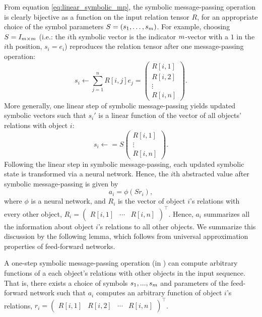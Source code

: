 From equation \eqref{eq:linear_symbolic_mp}, the symbolic message-passing operation is clearly bijective as a function on the input relation tensor $R$, for an appropriate choice of the symbol parameters $S = (s_1,\ldots, s_m)$. For example, choosing $S = I_{m \times m}$ (i.e.: the $i$th symbolic vector is the indicator $m$-vector with a $1$ in the $i$th position, $s_i = e_i$) reproduces the relation tensor after one message-passing operation:
\begin{equation*}
	s_i  \leftarrow  \sum_{j=1}^{n} R[i,j] e_j = \begin{pmatrix}R[i,1] \\ R[i,2] \\ \vdots \\ R[i,n]\end{pmatrix}.
\end{equation*}
More generally, one linear step of symbolic message-passing yields updated symbolic vectors such that $s_i'$ is a linear function of the vector of all objects' relations with object $i$:
\begin{equation*}
	s_i \leftarrow = S \begin{pmatrix}R[i,1] \\ \vdots \\ R[i,n]\end{pmatrix}.
\end{equation*}
Following the linear step in symbolic message-passing, each updated symbolic state is transformed via a neural network. Hence, the $i$th abstracted value after symbolic message-passing is given by
\begin{equation*}
	a_i = \phi\left(S r_i \right),
\end{equation*}
where $\phi$ is a neural network, and $R_i$ is the vector of object $i$'s relations with every other object, $R_i = \begin{pmatrix}R[i,1] & \cdots & R[i,n]\end{pmatrix}^\top$. Hence, $a_i$ summarizes all the information about object $i$'s relations to all other objects. We summarize this discussion by the following 
lemma, which follows from universal approximation properties of feed-forward networks.

\begin{lemma}
	\label{lemma:function_class_1_step_symbolic_mp}
	A one-step symbolic message-passing operation (in ) can compute arbitrary functions of a each object's relations with other objects in the input sequence. That is, there exists a choice of symbols $s_1, ..., s _m$ and parameters of the feed-forward network such that $a_i$ computes an arbitrary function of object $i$'s relations, $r_i = \begin{pmatrix}R[i,1] & R[i,2] & \cdots & R[i,n]\end{pmatrix}^\top$.
\end{lemma}


